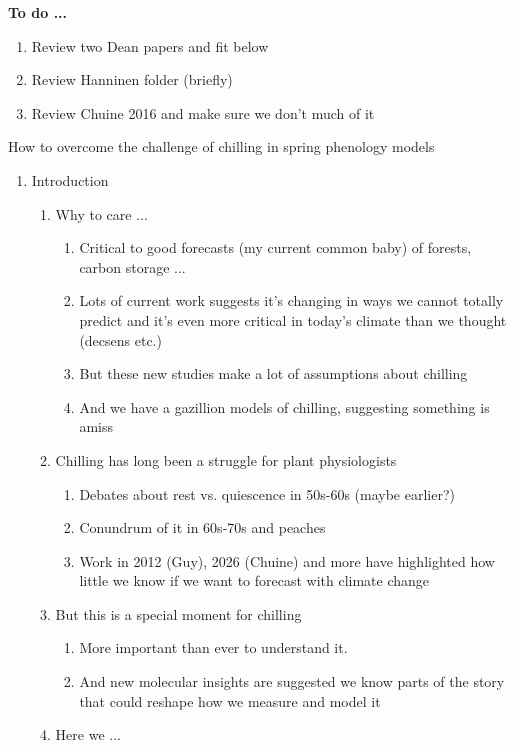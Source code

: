\documentclass[11pt,letter]{article}
\begin{document}
{\bf To do ... }
\begin{enumerate}
\item Review two Dean papers and fit below
\item Review Hanninen folder (briefly)
\item Review Chuine 2016 and make sure we don't much of it
\end{enumerate}

{\sc How to overcome the challenge of chilling in spring phenology models} %
\begin{enumerate}
\item Introduction
\begin{enumerate}
\item Why to care ...
\begin{enumerate}
\item Critical to good forecasts (my current common baby) of forests, carbon storage ...
\item Lots of current work suggests it's changing in ways we cannot totally predict and it's even more critical in today's climate than we thought (decsens etc.)
\item But these new studies make a lot of assumptions about chilling 
\item And we have a gazillion models of chilling, suggesting something is amiss
\end{enumerate}
\item Chilling has long been a struggle for plant physiologists
\begin{enumerate}
\item Debates about rest vs. quiescence in 50s-60s (maybe earlier?)
\item Conundrum of it in 60s-70s and peaches
\item Work in 2012 (Guy), 2026 (Chuine) and more have highlighted how little we know if we want to forecast with climate change
\end{enumerate}
\item But this is a special moment for chilling
\begin{enumerate}
\item More important than ever to understand it.
\item And new molecular insights are suggested we know parts of the story that could reshape how we measure and model it
\end{enumerate}
\item Here we ...
\end{enumerate}

\end{enumerate}
\end{document}
